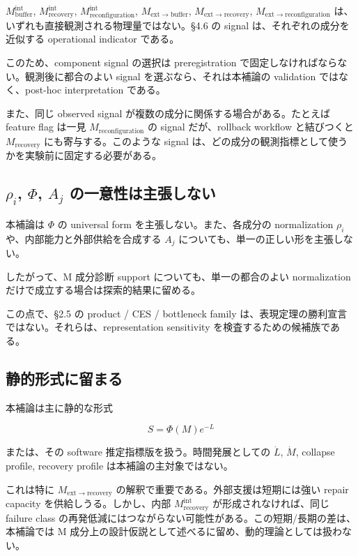 \documentclass[12pt,a4paper]{article}
\begin{document}
\(M_{\mathrm{buffer}}^{\mathrm{int}}\), \(M_{\mathrm{recovery}}^{\mathrm{int}}\), \(M_{\mathrm{reconfiguration}}^{\mathrm{int}}\), \(M_{\mathrm{ext}\to\mathrm{buffer}}\), \(M_{\mathrm{ext}\to\mathrm{recovery}}\), \(M_{\mathrm{ext}\to\mathrm{reconfiguration}}\) は、いずれも直接観測される物理量ではない。§4.6 の signal は、それぞれの成分を近似する operational indicator である。

このため、component signal の選択は preregistration で固定しなければならない。観測後に都合のよい signal を選ぶなら、それは本補論の validation ではなく、post-hoc interpretation である。

また、同じ observed signal が複数の成分に関係する場合がある。たとえば feature flag は一見 \(M_{\mathrm{reconfiguration}}\) の signal だが、rollback workflow と結びつくと \(M_{\mathrm{recovery}}\) にも寄与する。このような signal は、どの成分の観測指標として使うかを実験前に固定する必要がある。

\subsection{\texorpdfstring{\(\rho_i\), \(\Phi\), \(A_j\) の一意性は主張しない}{\textbackslash rho\_i, \textbackslash Phi, A\_j の一意性は主張しない}}\label{rho_i-phi-a_j-ux306eux4e00ux610fux6027ux306fux4e3bux5f35ux3057ux306aux3044}

本補論は \(\Phi\) の universal form を主張しない。また、各成分の normalization \(\rho_i\) や、内部能力と外部供給を合成する \(A_j\) についても、単一の正しい形を主張しない。

したがって、M 成分診断 support についても、単一の都合のよい normalization だけで成立する場合は探索的結果に留める。

この点で、§2.5 の product / CES / bottleneck family は、表現定理の勝利宣言ではない。それらは、representation sensitivity を検査するための候補族である。

\subsection{静的形式に留まる}\label{ux9759ux7684ux5f62ux5f0fux306bux7559ux307eux308b}

本補論は主に静的な形式

\[
S = \Phi(M) e^{-L}
\]

または、その software 推定指標版を扱う。時間発展としての \(\dot L\), \(\dot M\), collapse profile, recovery profile は本補論の主対象ではない。

これは特に \(M_{\mathrm{ext}\to\mathrm{recovery}}\) の解釈で重要である。外部支援は短期には強い repair capacity を供給しうる。しかし、内部 \(M_{\mathrm{recovery}}^{\mathrm{int}}\) が形成されなければ、同じ failure class の再発低減にはつながらない可能性がある。この短期/長期の差は、本補論では M 成分上の設計仮説として述べるに留め、動的理論としては扱わない。
\end{document}

